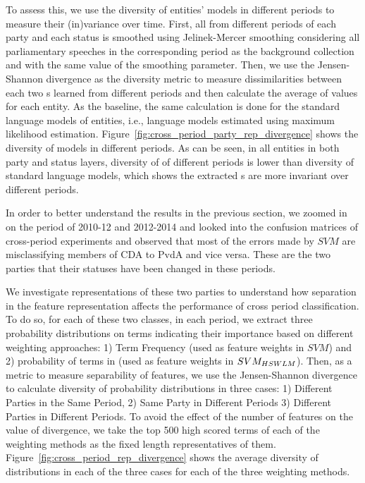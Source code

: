 To assess this, we use the diversity of entities' models in different periods to measure their (in)variance over time.
%
First, all \achswlm from different periods of each party and each status is smoothed using Jelinek-Mercer smoothing \citep{Zhai:2001} considering all parliamentary speeches in the corresponding period as the background collection and with the same value of the smoothing parameter. Then, we use the Jensen-Shannon divergence as the diversity metric to measure dissimilarities between each two {\achswlm}s learned from different periods and then calculate the average of values for each entity. As the baseline, the same calculation is done for the standard language models of entities, i.e., language models estimated using maximum likelihood estimation. 
Figure~\ref{fig:cross_period_party_rep_divergence} shows the diversity of models in different periods.
%
As can be seen, in all entities in both party and status layers, diversity of \achswlm of different periods is lower than diversity of standard language models, which shows the extracted {\achswlm}s are more invariant over different periods. 


In order to better understand the results in the previous section, we zoomed in on the period of 2010-12 and 2012-2014 and looked into the confusion matrices of cross-period experiments and observed that most of the errors made by $SVM$ are misclassifying members of CDA to PvdA and vice versa. These are the two parties that their statuses have been changed in these periods.  


We investigate representations of these two parties to understand how separation in the feature representation affects the performance of cross period classification. To do so, for each of these two classes, in each period, we extract three probability distributions on terms indicating their importance based on different weighting approaches: 1) Term Frequency (used as feature weights in $SVM$) and 2) probability of terms in \achswlm (used as feature weights in $SVM_{HSWLM}$). 
Then, as a metric to measure separability of features, we use the Jensen-Shannon divergence to calculate diversity of probability distributions in three cases: 1) Different Parties in the Same Period, 2) Same Party in Different Periods 3) Different Parties in Different Periods. 
To avoid the effect of the number of features on the value of divergence, we take the top 500 high scored terms of each of the weighting methods as the fixed length representatives of them. Figure~\ref{fig:cross_period_rep_divergence} shows the average diversity of distributions in each of the three cases for each of the three weighting methods.

